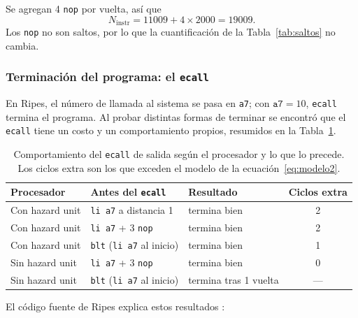 \documentclass[11pt,a4paper]{article}
\begin{document}
Se agregan 4 \texttt{nop} por vuelta, as\'i que
\begin{equation}
  N_{\text{instr}} = 11009 + 4 \times 2000 = 19009 .
\end{equation}
Los \texttt{nop} no son saltos, por lo que la cuantificaci\'on de la
Tabla~\ref{tab:saltos} no cambia.
 
\subsubsection{Terminaci\'on del programa: el \texttt{ecall}}
\label{sec:ecall}
 
En Ripes, el n\'umero de llamada al sistema se pasa en \texttt{a7}; con
$\texttt{a7} = 10$, \texttt{ecall} termina el programa. Al probar distintas
formas de terminar se encontr\'o que el \texttt{ecall} tiene un costo y un
comportamiento propios, resumidos en la Tabla~\ref{tab:ecall}.
 
\begin{table}[h]
  \centering
  \small
  \begin{tabular}{@{}lllc@{}}
    \toprule
    Procesador & Antes del \texttt{ecall} & Resultado & Ciclos extra \\
    \midrule
    Con hazard unit & \texttt{li a7} a distancia 1           & termina bien & 2 \\
    Con hazard unit & \texttt{li a7} + 3 \texttt{nop}        & termina bien & 2 \\
    Con hazard unit & \texttt{blt} (\texttt{li a7} al inicio) & termina bien & 1 \\
    Sin hazard unit & \texttt{li a7} + 3 \texttt{nop}        & termina bien & 0 \\
    Sin hazard unit & \texttt{blt} (\texttt{li a7} al inicio) & termina tras 1 vuelta & --- \\
    \bottomrule
  \end{tabular}
  \caption{Comportamiento del \texttt{ecall} de salida seg\'un el procesador y
  lo que lo precede. Los ciclos extra son los que exceden el modelo de la
  ecuaci\'on~\eqref{eq:modelo2}.}
  \label{tab:ecall}
\end{table}
 
El c\'odigo fuente de Ripes explica estos resultados \cite{ripes_src}:
 
\end{document}

